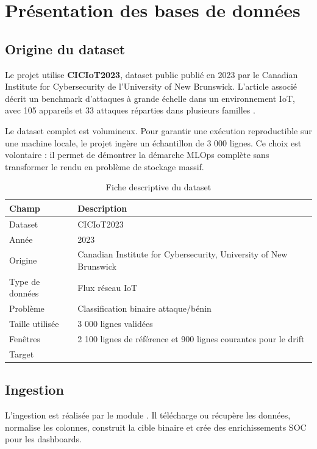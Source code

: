 \chapter{Présentation des bases de données}

\section{Origine du dataset}
Le projet utilise \textbf{CICIoT2023}, dataset public publié en 2023 par le Canadian Institute for Cybersecurity de l'University of New Brunswick. L'article associé décrit un benchmark d'attaques à grande échelle dans un environnement IoT, avec 105 appareils et 33 attaques réparties dans plusieurs familles \cite{neto2023ciciot,unb2023ciciot}.

Le dataset complet est volumineux. Pour garantir une exécution reproductible sur une machine locale, le projet ingère un échantillon de 3 000 lignes. Ce choix est volontaire : il permet de démontrer la démarche MLOps complète sans transformer le rendu en problème de stockage massif.

\begin{table}[H]
\centering
\caption{Fiche descriptive du dataset}
\label{tab:dataset_description}
\begin{tabularx}{\linewidth}{@{}lY@{}}
\toprule
\textbf{Champ} & \textbf{Description}\\
\midrule
Dataset & CICIoT2023\\
Année & 2023\\
Origine & Canadian Institute for Cybersecurity, University of New Brunswick\\
Type de données & Flux réseau IoT\\
Problème & Classification binaire attaque/bénin\\
Taille utilisée & 3 000 lignes validées\\
Fenêtres & 2 100 lignes de référence et 900 lignes courantes pour le drift\\
Target & \\
\bottomrule
\end{tabularx}
\end{table}

\section{Ingestion}
L'ingestion est réalisée par le module . Il télécharge ou récupère les données, normalise les colonnes, construit la cible binaire et crée des enrichissements SOC pour les dashboards.

